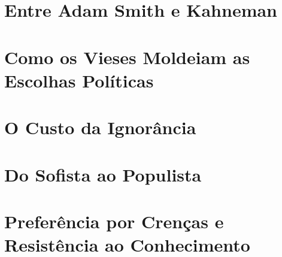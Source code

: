 \section{Entre Adam Smith e Kahneman} %


\section{Como os Vieses Moldeiam as Escolhas Políticas} %


\section{O Custo da Ignorância} %


\section{Do Sofista ao Populista} %


\section{Preferência por Crenças e Resistência ao Conhecimento}

